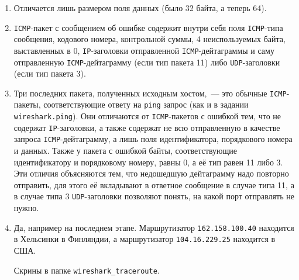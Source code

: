 \documentclass[12pt]{article}
\begin{document}
\begin{enumerate}

\item Отличается лишь размером поля данных (было 32 байта, а теперь 64).

\item \texttt{ICMP}-пакет с сообщением об ошибке содержит внутри себя поля \texttt{ICMP}-типа сообщения, кодового номера, контрольной суммы, 4 неиспользуемых байта, выставленных в 0, \texttt{IP}-заголовки отправленной \texttt{ICMP}-дейтаграммы и саму отправленную \texttt{ICMP}-дейтаграмму (если тип пакета 11) либо \texttt{UDP}-заголовки (если тип пакета 3).

\item Три последних пакета, полученных исходным хостом,~--- это обычные \texttt{ICMP}-пакеты, соответствующие ответу на \texttt{ping} запрос (как и в задании \texttt{wireshark.ping}). Они отличаются от \texttt{ICMP}-пакетов с ошибкой тем, что не содержат \texttt{IP}-заголовки, а также содержат не всю отправленную в качестве запроса \texttt{ICMP}-дейтаграмму, а лишь поля идентификатора, порядкового номера и данных. Также у пакета с ошибкой байты, соответствующие идентификатору и порядковому номеру, равны 0, а её тип равен 11 либо 3. Эти отличия объясняются тем, что недошедшую дейтаграмму надо повторно отправить, для этого её вкладывают в ответное сообщение в случае типа 11, а в случае типа 3 \texttt{UDP}-заголовки позволяют понять, на какой порт отправлять не нужно.

\item Да, например на последнем этапе. Маршрутизатор \texttt{162.158.100.40} находится в Хельсинки в Финляндии, а маршрутизатор \texttt{104.16.229.25} находится в США.

Скрины в папке \texttt{wireshark\_traceroute}.

\end{enumerate}
\end{document}
